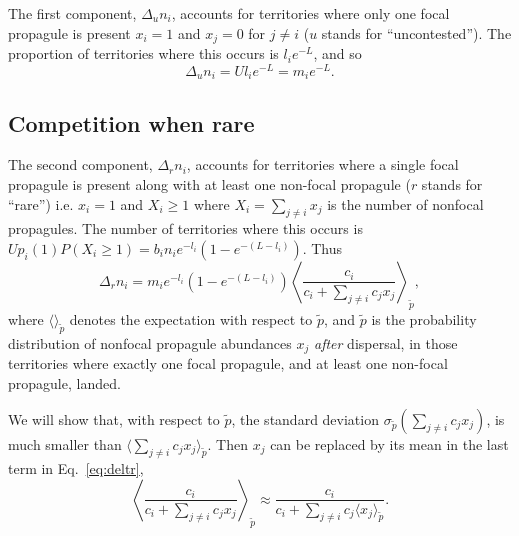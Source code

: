\documentclass[11pt]{article}
\begin{document}
The first component, $\Delta_u n_i$, accounts for territories where only one focal propagule is present $x_i=1$ and $x_j=0$ for $j\neq i$ ($u$ stands for ``uncontested''). The proportion of territories where this occurs is $l_i e^{-L}$, and so 
\begin{equation}
\Delta_u n_i=Ul_i e^{-L}=m_i e^{-L}.
\end{equation}

\subsection*{Competition when rare}

The second component, $\Delta_r n_i$, accounts for territories where a single focal propagule is present along with at least one non-focal propagule ($r$ stands for ``rare'') i.e. $x_i=1$ and $X_i\geq 1$ where $X_i=\sum_{j\neq i} x_j$ is the number of nonfocal propagules. The number of territories where this occurs is $Up_i(1)P(X_i\geq 1)=b_i n_i e^{-l_i}(1-e^{-(L-l_i)})$. Thus 
\begin{equation}
\Delta_r n_i = m_i e^{-l_i}(1-e^{-(L-l_i)})\left\langle  \frac{c_i}{c_i +\sum_{j\neq i} c_j x_j } \right\rangle_{\tilde{p}},  \label{eq:deltr}
\end{equation}
where $\langle \rangle_{\tilde{p}}$ denotes the expectation with respect to $\tilde{p}$, and $\tilde{p}$ is the probability distribution of nonfocal propagule abundances $x_j$ \textit{after} dispersal, in those territories where exactly one focal propagule, and at least one non-focal propagule, landed. 

We will show that, with respect to $\tilde{p}$, the standard deviation $\sigma_{\tilde{p}}(\sum_{j\neq i} c_j x_j)$, is much smaller than $\langle\sum_{j\neq i} c_j x_j\rangle_{\tilde{p}}$. Then $x_j$ can be replaced by its mean in the last term in Eq.~\eqref{eq:deltr},
\begin{equation}
\left\langle\frac{c_i}{c_i +\sum_{j\neq i} c_j x_j}\right\rangle_{\tilde{p}}\approx \frac{c_i}{c_i +\sum_{j\neq i} c_j \langle x_j\rangle_{\tilde{p}}}.\label{eq:meanfieldr}
\end{equation}
\end{document}
